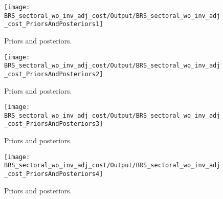  
\begin{figure}[H]
\centering
\texttt{[image: BRS\_sectoral\_wo\_inv\_adj\_cost/Output/BRS\_sectoral\_wo\_inv\_adj\_cost\_PriorsAndPosteriors1]}
\caption{Priors and posteriors.}\label{Fig:PriorsAndPosteriors:1}
\end{figure}
 
\begin{figure}[H]
\centering
\texttt{[image: BRS\_sectoral\_wo\_inv\_adj\_cost/Output/BRS\_sectoral\_wo\_inv\_adj\_cost\_PriorsAndPosteriors2]}
\caption{Priors and posteriors.}\label{Fig:PriorsAndPosteriors:2}
\end{figure}
 
\begin{figure}[H]
\centering
\texttt{[image: BRS\_sectoral\_wo\_inv\_adj\_cost/Output/BRS\_sectoral\_wo\_inv\_adj\_cost\_PriorsAndPosteriors3]}
\caption{Priors and posteriors.}\label{Fig:PriorsAndPosteriors:3}
\end{figure}
 
\begin{figure}[H]
\centering
\texttt{[image: BRS\_sectoral\_wo\_inv\_adj\_cost/Output/BRS\_sectoral\_wo\_inv\_adj\_cost\_PriorsAndPosteriors4]}
\caption{Priors and posteriors.}\label{Fig:PriorsAndPosteriors:4}
\end{figure}
 
